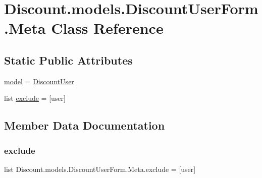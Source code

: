 \hypertarget{class_discount_1_1models_1_1_discount_user_form_1_1_meta}{}\section{Discount.\+models.\+Discount\+User\+Form.\+Meta Class Reference}
\label{class_discount_1_1models_1_1_discount_user_form_1_1_meta}
\subsection*{Static Public Attributes}
\begin{DoxyCompactItemize}
\item 
\hyperlink{class_discount_1_1models_1_1_discount_user_form_1_1_meta_ad2d52513cb80a4080599c531cc6e4d54}{model} = \hyperlink{class_discount_1_1models_1_1_discount_user}{Discount\+User}
\item 
list \hyperlink{class_discount_1_1models_1_1_discount_user_form_1_1_meta_a81a8758b66f58fa3d705d00b4bf7b8e8}{exclude} = \mbox{[}\textquotesingle{}user\textquotesingle{}\mbox{]}
\end{DoxyCompactItemize}


\subsection{Member Data Documentation}
\mbox{\label{class_discount_1_1models_1_1_discount_user_form_1_1_meta_a81a8758b66f58fa3d705d00b4bf7b8e8}} 
\subsubsection{\texorpdfstring{exclude}{exclude}}
{\footnotesize\ttfamily list Discount.\+models.\+Discount\+User\+Form.\+Meta.\+exclude = \mbox{[}\textquotesingle{}user\textquotesingle{}\mbox{]}\hspace{0.3cm}{\ttfamily [static]}}

\mbox{\label{class_discount_1_1models_1_1_discount_user_form_1_1_meta_ad2d52513cb80a4080599c531cc6e4d54}} 
